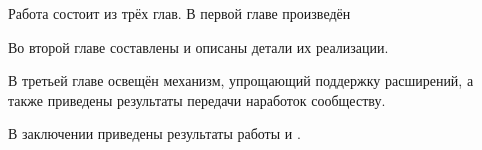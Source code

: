 Работа состоит из трёх глав. В первой главе произведён  

Во второй главе составлены   и описаны детали их реализации. 

В третьей главе освещён механизм, упрощающий поддержку расширений, а также приведены результаты передачи наработок сообществу. 

В заключении приведены результаты работы и .

